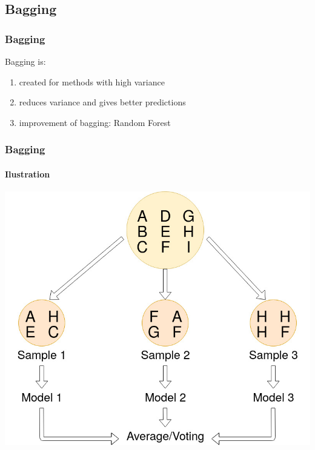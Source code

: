 \subsection{Bagging}

\begin{frame}
    \frametitle{Bagging}

	Bagging is:
    \begin{enumerate}
    \item created for methods with high variance
    \item reduces variance and gives better predictions
    \item improvement of bagging: Random Forest
    \end{enumerate}
    

\end{frame}

\begin{frame}
    \frametitle{Bagging}
  \framesubtitle{Ilustration}

	\begin{center}		
		\includegraphics[height=0.7\textheight]{images/bagging_1.jpg}
	\end{center}

\end{frame}